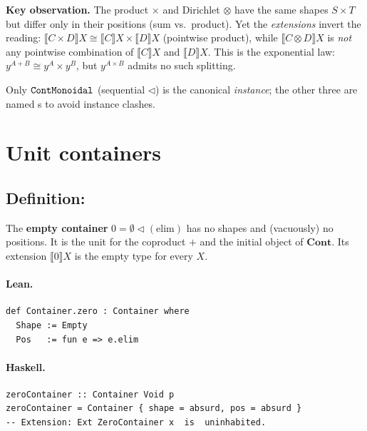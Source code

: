 \documentclass[11pt,a4paper]{article}
\begin{document}
\medskip
\noindent
\textbf{Key observation.} The product $\times$ and Dirichlet $\otimes$ have the
same shapes $S \times T$ but differ only in their positions (sum vs.\ product).
Yet the \emph{extensions} invert the reading:
$\llbracket C \times D \rrbracket X \cong \llbracket C \rrbracket X \times \llbracket D \rrbracket X$
(pointwise product), while
$\llbracket C \otimes D \rrbracket X$ is \emph{not} any pointwise combination
of $\llbracket C \rrbracket X$ and $\llbracket D \rrbracket X$.
This is the exponential law: $y^{A+B} \cong y^A \times y^B$, but $y^{A \times B}$
admits no such splitting.

Only $\texttt{ContMonoidal}$ (sequential $\triangleleft$) is the canonical
 \emph{instance}; the other three are named
s to avoid instance clashes.

\section{Unit containers}

\subsection{Definition: }

\begin{defn}
The \textbf{empty container} $0 = \emptyset \triangleleft (\mathrm{elim})$ has
no shapes and (vacuously) no positions.  It is the unit for the coproduct $+$
and the initial object of $\mathbf{Cont}$.
Its extension $\llbracket 0 \rrbracket X$ is the empty type for every $X$.
\end{defn}

\paragraph{Lean.}
\begin{lstlisting}[style=lean]
def Container.zero : Container where
  Shape := Empty
  Pos   := fun e => e.elim
\end{lstlisting}

\paragraph{Haskell.}
\begin{lstlisting}[style=haskell]
zeroContainer :: Container Void p
zeroContainer = Container { shape = absurd, pos = absurd }
-- Extension: Ext ZeroContainer x  is  uninhabited.
\end{lstlisting}
\end{document}
